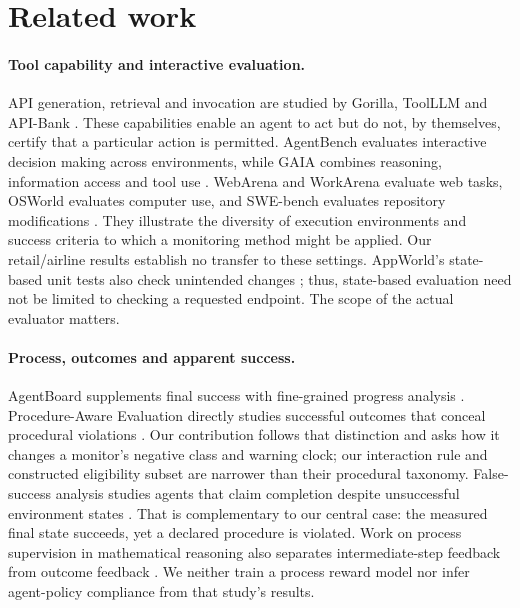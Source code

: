 \documentclass[10pt]{article}
\begin{document}
\section{Related work}
\label{sec:related}
\paragraph{Tool capability and interactive evaluation.}
API generation, retrieval and invocation are studied by Gorilla, ToolLLM and API-Bank \citep{patil2023gorilla,qin2023toolllm,li2023apibank}. These capabilities enable an agent to act but do not, by themselves, certify that a particular action is permitted. AgentBench evaluates interactive decision making across environments, while GAIA combines reasoning, information access and tool use \citep{liu2023agentbench,mialon2023gaia}. WebArena and WorkArena evaluate web tasks, OSWorld evaluates computer use, and SWE-bench evaluates repository modifications \citep{zhou2023webarena,drouin2024workarena,xie2024osworld,jimenez2024swebench}. They illustrate the diversity of execution environments and success criteria to which a monitoring method might be applied. Our retail/airline results establish no transfer to these settings. AppWorld's state-based unit tests also check unintended changes \citep{trivedi2024appworld}; thus, state-based evaluation need not be limited to checking a requested endpoint. The scope of the actual evaluator matters.

\paragraph{Process, outcomes and apparent success.}
AgentBoard supplements final success with fine-grained progress analysis \citep{ma2024agentboard}. Procedure-Aware Evaluation directly studies successful outcomes that conceal procedural violations \citep{cao2026procedure}. Our contribution follows that distinction and asks how it changes a monitor's negative class and warning clock; our interaction rule and constructed eligibility subset are narrower than their procedural taxonomy. False-success analysis studies agents that claim completion despite unsuccessful environment states \citep{advani2026false}. That is complementary to our central case: the measured final state succeeds, yet a declared procedure is violated. Work on process supervision in mathematical reasoning also separates intermediate-step feedback from outcome feedback \citep{lightman2023verify}. We neither train a process reward model nor infer agent-policy compliance from that study's results.
\end{document}

